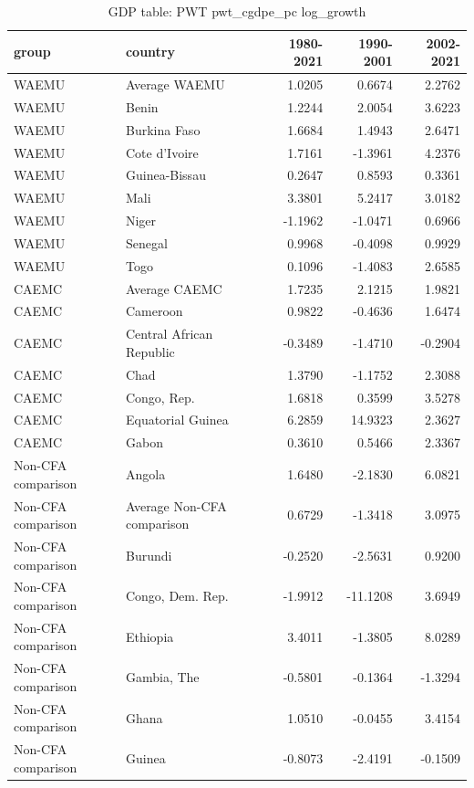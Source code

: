 \begin{table}

\caption{GDP table: PWT pwt_cgdpe_pc log_growth}
\centering
\begin{tabular}[t]{llrrr}
\toprule
group & country & 1980-2021 & 1990-2001 & 2002-2021\\
\midrule
WAEMU & Average WAEMU & 1.0205 & 0.6674 & 2.2762\\
WAEMU & Benin & 1.2244 & 2.0054 & 3.6223\\
WAEMU & Burkina Faso & 1.6684 & 1.4943 & 2.6471\\
WAEMU & Cote d'Ivoire & 1.7161 & -1.3961 & 4.2376\\
WAEMU & Guinea-Bissau & 0.2647 & 0.8593 & 0.3361\\
\addlinespace
WAEMU & Mali & 3.3801 & 5.2417 & 3.0182\\
WAEMU & Niger & -1.1962 & -1.0471 & 0.6966\\
WAEMU & Senegal & 0.9968 & -0.4098 & 0.9929\\
WAEMU & Togo & 0.1096 & -1.4083 & 2.6585\\
CAEMC & Average CAEMC & 1.7235 & 2.1215 & 1.9821\\
\addlinespace
CAEMC & Cameroon & 0.9822 & -0.4636 & 1.6474\\
CAEMC & Central African Republic & -0.3489 & -1.4710 & -0.2904\\
CAEMC & Chad & 1.3790 & -1.1752 & 2.3088\\
CAEMC & Congo, Rep. & 1.6818 & 0.3599 & 3.5278\\
CAEMC & Equatorial Guinea & 6.2859 & 14.9323 & 2.3627\\
\addlinespace
CAEMC & Gabon & 0.3610 & 0.5466 & 2.3367\\
Non-CFA comparison & Angola & 1.6480 & -2.1830 & 6.0821\\
Non-CFA comparison & Average Non-CFA comparison & 0.6729 & -1.3418 & 3.0975\\
Non-CFA comparison & Burundi & -0.2520 & -2.5631 & 0.9200\\
Non-CFA comparison & Congo, Dem. Rep. & -1.9912 & -11.1208 & 3.6949\\
\addlinespace
Non-CFA comparison & Ethiopia & 3.4011 & -1.3805 & 8.0289\\
Non-CFA comparison & Gambia, The & -0.5801 & -0.1364 & -1.3294\\
Non-CFA comparison & Ghana & 1.0510 & -0.0455 & 3.4154\\
Non-CFA comparison & Guinea & -0.8073 & -2.4191 & -0.1509\\

\end{tabular}
\end{table}
